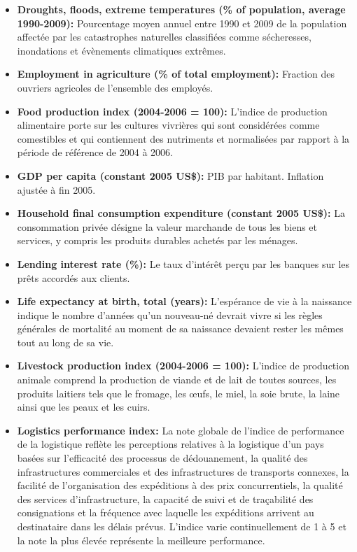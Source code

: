 \begin{itemize}
		\item \textbf{ Droughts, floods, extreme temperatures (\% of population, average 1990-2009):} Pourcentage moyen annuel entre 1990 et 2009 de la population affectée par les catastrophes naturelles classifiées comme sécheresses, inondations et évènements climatiques extrêmes.
		\item \textbf{ Employment in agriculture (\% of total employment):} Fraction des ouvriers agricoles de l'ensemble des employés.
		\item \textbf{ Food production index (2004-2006 = 100):} L'indice de production alimentaire porte sur les cultures vivrières qui sont considérées comme comestibles et qui contiennent des nutriments et normalisées par rapport à la période de référence de 2004 à 2006.
		\item \textbf{ GDP per capita (constant 2005 US\$):} PIB par habitant. Inflation ajustée à fin 2005.
		\item \textbf{ Household final consumption expenditure (constant 2005 US\$):}  La consommation privée désigne la valeur marchande de tous les biens et services, y compris les produits durables achetés par les ménages.
		\item \textbf{ Lending interest rate (\%):} Le taux d'intérêt perçu par les banques sur les prêts accordés aux clients.	
		\item \textbf{ Life expectancy at birth, total (years):} L'espérance de vie à la naissance indique le nombre d'années qu'un nouveau-né devrait vivre si les règles générales de mortalité au moment de sa naissance devaient rester les mêmes tout au long de sa vie.
		\item \textbf{ Livestock production index (2004-2006 = 100):} L'indice de production animale comprend la production de viande et de lait de toutes sources, les produits laitiers tels que le fromage, les œufs, le miel, la soie brute, la laine ainsi que les peaux et les cuirs.
		\item \textbf{ Logistics performance index:} La note globale de l'indice de performance de la logistique reflète les perceptions relatives à la logistique d'un pays basées sur l'efficacité des processus de dédouanement, la qualité des infrastructures commerciales et des infrastructures de transports connexes, la facilité de l'organisation des expéditions à des prix concurrentiels, la qualité des services d'infrastructure, la capacité de suivi et de traçabilité des consignations et la fréquence avec laquelle les expéditions arrivent au destinataire dans les délais prévus. L'indice varie continuellement de 1 à 5 et la note la plus élevée représente la meilleure performance.

\end{itemize}
